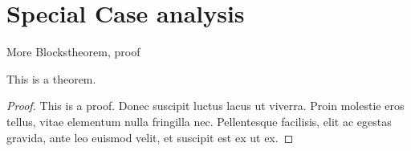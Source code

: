 \section{Special Case analysis}
\begin{frame}{More Blocks}{theorem, proof}
  \begin{theorem}
    This is a theorem.
  \end{theorem}
  \begin{proof}
    This is a proof.  Donec suscipit luctus lacus ut viverra. Proin molestie
    eros tellus, vitae elementum nulla fringilla nec. Pellentesque facilisis,
    elit ac egestas gravida, ante leo euismod velit, et suscipit est ex ut ex.
  \end{proof}
\end{frame}